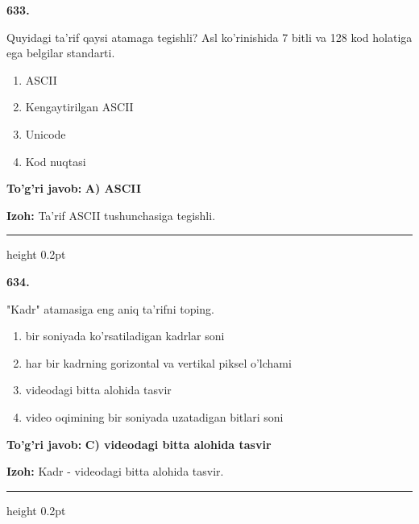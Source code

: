\documentclass[10pt,a4paper,oneside]{article}
\begin{document}
\noindent\textbf{\color{ink}633.}
\par
Quyidagi ta'rif qaysi atamaga tegishli? Asl ko'rinishida 7 bitli va 128 kod holatiga ega belgilar standarti.
\begin{enumerate}[label=\Alph*),leftmargin=9mm]
\item ASCII
\item Kengaytirilgan ASCII
\item Unicode
\item Kod nuqtasi
\end{enumerate}
\begin{tcolorbox}[enhanced,breakable,colback=teal!4,colframe=teal!50!black,boxrule=0.5pt,arc=1.1mm,left=3mm,right=3mm,top=1.7mm,bottom=1.7mm,before skip=2mm,after skip=2mm]
\textbf{\color{teal}To'g'ri javob:} \textbf{A) ASCII}
\par\smallskip
\textbf{Izoh:} Ta'rif ASCII tushunchasiga tegishli.
\end{tcolorbox}
\vspace{2mm}\hrule height 0.2pt \vspace{3mm}

\noindent\textbf{\color{ink}634.}
\par
"Kadr" atamasiga eng aniq ta'rifni toping.
\begin{enumerate}[label=\Alph*),leftmargin=9mm]
\item bir soniyada ko'rsatiladigan kadrlar soni
\item har bir kadrning gorizontal va vertikal piksel o'lchami
\item videodagi bitta alohida tasvir
\item video oqimining bir soniyada uzatadigan bitlari soni
\end{enumerate}
\begin{tcolorbox}[enhanced,breakable,colback=teal!4,colframe=teal!50!black,boxrule=0.5pt,arc=1.1mm,left=3mm,right=3mm,top=1.7mm,bottom=1.7mm,before skip=2mm,after skip=2mm]
\textbf{\color{teal}To'g'ri javob:} \textbf{C) videodagi bitta alohida tasvir}
\par\smallskip
\textbf{Izoh:} Kadr - videodagi bitta alohida tasvir.
\end{tcolorbox}
\vspace{2mm}\hrule height 0.2pt \vspace{3mm}
\end{document}
